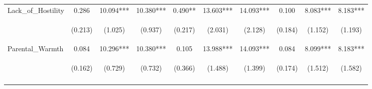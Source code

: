 \begin{tabular}{lccccccccc}
\noalign{\smallskip}Lack_of_Hostility & 0.286 & 10.094*** & 10.380*** & 0.490** & 13.603*** & 14.093*** & 0.100 & 8.083*** & 8.183***\\
 & \begin{footnotesize}(0.213)\end{footnotesize} & \begin{footnotesize}(1.025)\end{footnotesize} & \begin{footnotesize}(0.937)\end{footnotesize} & \begin{footnotesize}(0.217)\end{footnotesize} & \begin{footnotesize}(2.031)\end{footnotesize} & \begin{footnotesize}(2.128)\end{footnotesize} & \begin{footnotesize}(0.184)\end{footnotesize} & \begin{footnotesize}(1.152)\end{footnotesize} & \begin{footnotesize}(1.193)\end{footnotesize}\\
\noalign{\smallskip}Parental_Warmth & 0.084 & 10.296*** & 10.380*** & 0.105 & 13.988*** & 14.093*** & 0.084 & 8.099*** & 8.183***\\
 & \begin{footnotesize}(0.162)\end{footnotesize} & \begin{footnotesize}(0.729)\end{footnotesize} & \begin{footnotesize}(0.732)\end{footnotesize} & \begin{footnotesize}(0.366)\end{footnotesize} & \begin{footnotesize}(1.488)\end{footnotesize} & \begin{footnotesize}(1.399)\end{footnotesize} & \begin{footnotesize}(0.174)\end{footnotesize} & \begin{footnotesize}(1.512)\end{footnotesize} & \begin{footnotesize}(1.582)\end{footnotesize}\\
\noalign{\smallskip}\hline\end{tabular}\\
